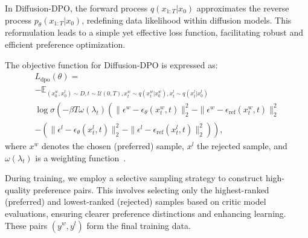 In Diffusion-DPO, the forward process $q(x_{1:T}|x_0)$ approximates the reverse process $p_\theta(x_{1:T}|x_0)$, redefining data likelihood within diffusion models. This reformulation leads to a simple yet effective loss function, facilitating robust and efficient preference optimization.


The objective function for Diffusion-DPO is expressed as:
\small
\begin{multline}
    L_{\text{dpo}}(\theta) = \\
    -\mathbb{E}_{
    (x^w_0, x^l_0) \sim D, t\sim \mathcal{U}(0,T), %
    x^w_{t}\sim q(x^w_{t}|x^w_0), x^l_{t} \sim q(x^l_{t}|x^l_0)
    } \\
    \log\sigma \left( -\beta T \omega(\lambda_t) \left( \| \epsilon^w - \epsilon_\theta(x_{t}^w,t)\|^2_2 - \|\epsilon^w - \epsilon_{\text{ref}}(x_{t}^w,t)\|^2_2 \right. \right. \\
    - \left. \left( \| \epsilon^l - \epsilon_\theta(x_{t}^l,t)\|^2_2 - \|\epsilon^l - \epsilon_{\text{ref}}(x_{t}^l,t)\|^2_2 \right) \right) ,
\end{multline}
\normalsize
where $x^w$ denotes the chosen (preferred) sample, $x^l$ the rejected sample, and $\omega(\lambda_t)$ is a weighting function~\cite{ho2020denoisingdiffusionprobabilisticmodels,vaediffusion,rafailov2024directpreferenceoptimizationlanguage}.



During training, we employ a selective sampling strategy to construct high-quality preference pairs. This involves selecting only the highest-ranked (preferred) and lowest-ranked (rejected) samples based on critic model evaluations, ensuring clearer preference distinctions and enhancing learning. These pairs $(y^{w}, y^{l})$ form the final training data.

